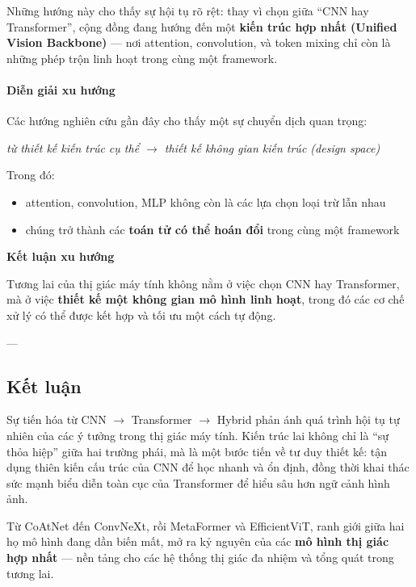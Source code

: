Những hướng này cho thấy sự hội tụ rõ rệt: thay vì chọn giữa “CNN hay Transformer”, cộng đồng đang hướng đến một \textbf{kiến trúc hợp nhất (Unified Vision Backbone)} — nơi attention, convolution, và token mixing chỉ còn là những phép trộn linh hoạt trong cùng một framework.

\paragraph{Diễn giải xu hướng}

Các hướng nghiên cứu gần đây cho thấy một sự chuyển dịch quan trọng:

\begin{center}
	\textit{từ thiết kế kiến trúc cụ thể $\rightarrow$ thiết kế không gian kiến trúc (design space)}
\end{center}

Trong đó:
\begin{itemize}
	\item attention, convolution, MLP không còn là các lựa chọn loại trừ lẫn nhau
	\item chúng trở thành các \textbf{toán tử có thể hoán đổi} trong cùng một framework
\end{itemize}

\begin{mdframed}[style=infobox]
	\textbf{Kết luận xu hướng}
	
	Tương lai của thị giác máy tính không nằm ở việc chọn CNN hay Transformer,  
	mà ở việc \textbf{thiết kế một không gian mô hình linh hoạt},  
	trong đó các cơ chế xử lý có thể được kết hợp và tối ưu một cách tự động.
\end{mdframed}
---

\subsection{Kết luận}
\label{subsec:hybrid_conclusion}

Sự tiến hóa từ CNN $\rightarrow$ Transformer $\rightarrow$ Hybrid phản ánh quá trình hội tụ tự nhiên của các ý tưởng trong thị giác máy tính.  
Kiến trúc lai không chỉ là “sự thỏa hiệp” giữa hai trường phái, mà là một bước tiến về tư duy thiết kế:  
tận dụng thiên kiến cấu trúc của CNN để học nhanh và ổn định, đồng thời khai thác sức mạnh biểu diễn toàn cục của Transformer để hiểu sâu hơn ngữ cảnh hình ảnh.  

Từ CoAtNet đến ConvNeXt, rồi MetaFormer và EfficientViT, ranh giới giữa hai họ mô hình đang dần biến mất, mở ra kỷ nguyên của các \textbf{mô hình thị giác hợp nhất} — nền tảng cho các hệ thống thị giác đa nhiệm và tổng quát trong tương lai.

